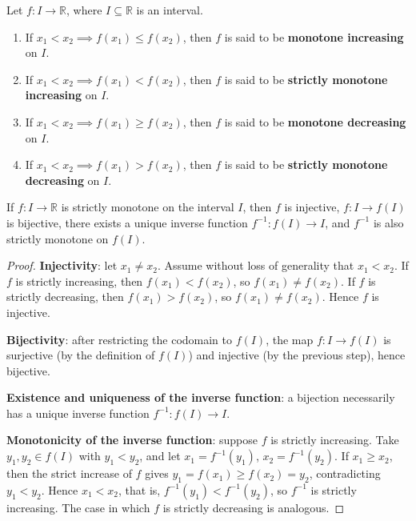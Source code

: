 \begin{definition}\label{def:monotonicity}
Let $f: I \to \mathbb{R}$, where $I \subseteq \mathbb{R}$ is an interval.
\begin{enumerate}[label=(\roman*)]
    \item If $x_1 < x_2 \implies f(x_1) \le f(x_2)$, then $f$ is said to be \textbf{monotone increasing} on $I$.
    \item If $x_1 < x_2 \implies f(x_1) < f(x_2)$, then $f$ is said to be \textbf{strictly monotone increasing} on $I$.
    \item If $x_1 < x_2 \implies f(x_1) \ge f(x_2)$, then $f$ is said to be \textbf{monotone decreasing} on $I$.
    \item If $x_1 < x_2 \implies f(x_1) > f(x_2)$, then $f$ is said to be \textbf{strictly monotone decreasing} on $I$.
\end{enumerate}
\end{definition}

\begin{proposition}\label{prop:strict_monotone_inverse}
If $f: I \to \mathbb{R}$ is strictly monotone on the interval $I$, then $f$ is injective, $f: I \to f(I)$ is bijective, there exists a unique inverse function $f^{-1}: f(I) \to I$, and $f^{-1}$ is also strictly monotone on $f(I)$.
\end{proposition}

\begin{proof}
\textbf{Injectivity}: let $x_1 \neq x_2$. Assume without loss of generality that $x_1 < x_2$. If $f$ is strictly increasing, then $f(x_1) < f(x_2)$, so $f(x_1) \neq f(x_2)$. If $f$ is strictly decreasing, then $f(x_1) > f(x_2)$, so $f(x_1) \neq f(x_2)$. Hence $f$ is injective.

\textbf{Bijectivity}: after restricting the codomain to $f(I)$, the map $f: I \to f(I)$ is surjective (by the definition of $f(I)$) and injective (by the previous step), hence bijective.

\textbf{Existence and uniqueness of the inverse function}: a bijection necessarily has a unique inverse function $f^{-1}: f(I) \to I$.

\textbf{Monotonicity of the inverse function}: suppose $f$ is strictly increasing. Take $y_1, y_2 \in f(I)$ with $y_1 < y_2$, and let $x_1 = f^{-1}(y_1)$, $x_2 = f^{-1}(y_2)$. If $x_1 \ge x_2$, then the strict increase of $f$ gives $y_1 = f(x_1) \ge f(x_2) = y_2$, contradicting $y_1 < y_2$. Hence $x_1 < x_2$, that is, $f^{-1}(y_1) < f^{-1}(y_2)$, so $f^{-1}$ is strictly increasing. The case in which $f$ is strictly decreasing is analogous.
\end{proof}

